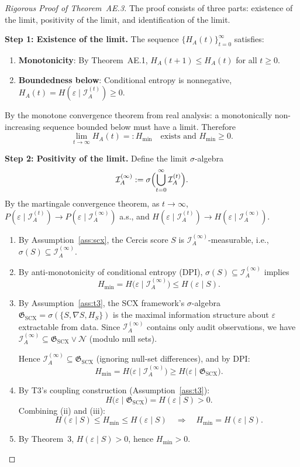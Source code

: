 \documentclass[12pt,a4paper]{article}
\newcommand{\cI}{\mathcal{I}}
\newcommand{\sG}{\mathfrak{G}}
\begin{document}
\begin{proof}[Rigorous Proof of Theorem~AE.3]
The proof consists of three parts: existence of the limit, positivity of the limit, and identification of the limit.

\textbf{Step 1: Existence of the limit.}
The sequence $\{H_A(t)\}_{t=0}^\infty$ satisfies:
\begin{enumerate}
    \item[(i)] \textbf{Monotonicity}: By Theorem~AE.1, $H_A(t+1) \le H_A(t)$ for all $t \ge 0$.
    \item[(ii)] \textbf{Boundedness below}: Conditional entropy is nonnegative, $H_A(t) = H(\varepsilon \mid \cI_A^{(t)}) \ge 0$.
\end{enumerate}
By the monotone convergence theorem from real analysis: a monotonically non-increasing sequence bounded below must have a limit. Therefore
\[
\lim_{t\to\infty} H_A(t) =: H_{\min} \quad \text{exists and } H_{\min} \ge 0.
\]

\textbf{Step 2: Positivity of the limit.}
Define the limit $\sigma$-algebra
\[
\cI_A^{(\infty)} := \sigma\Bigl(\bigcup_{t=0}^\infty \cI_A^{(t)}\Bigr).
\]
By the martingale convergence theorem, as $t \to \infty$, $P(\varepsilon \mid \cI_A^{(t)}) \to P(\varepsilon \mid \cI_A^{(\infty)})$ a.s., and $H(\varepsilon \mid \cI_A^{(t)}) \to H(\varepsilon \mid \cI_A^{(\infty)})$.

\begin{enumerate}
    \item[(i)] By Assumption~\ref{ass:scx}, the Cercis score $S$ is $\cI_A^{(\infty)}$-measurable, i.e., $\sigma(S) \subseteq \cI_A^{(\infty)}$.
    \item[(ii)] By anti-monotonicity of conditional entropy (DPI), $\sigma(S) \subseteq \cI_A^{(\infty)}$ implies
    \[
    H_{\min} = H\bigl(\varepsilon \mid \cI_A^{(\infty)}\bigr) \le H(\varepsilon \mid S).
    \]
    \item[(iii)] By Assumption~\ref{ass:t3}, the SCX framework's $\sigma$-algebra $\sG_{\mathrm{SCX}} = \sigma(\{S, \nabla S, H_S\})$ is the maximal information structure about $\varepsilon$ extractable from data. Since $\cI_A^{(\infty)}$ contains only audit observations, we have $\cI_A^{(\infty)} \subseteq \sG_{\mathrm{SCX}} \lor \mathcal{N}$ (modulo null sets).

    Hence $\cI_A^{(\infty)} \subseteq \sG_{\mathrm{SCX}}$ (ignoring null-set differences), and by DPI:
    \[
    H_{\min} = H\bigl(\varepsilon \mid \cI_A^{(\infty)}\bigr) \ge H\bigl(\varepsilon \mid \sG_{\mathrm{SCX}}\bigr).
    \]
    \item[(iv)] By T3's coupling construction (Assumption~\ref{ass:t3}):
    \[
    H\bigl(\varepsilon \mid \sG_{\mathrm{SCX}}\bigr) = H(\varepsilon \mid S) > 0.
    \]
    Combining (ii) and (iii):
    \[
    H(\varepsilon \mid S) \le H_{\min} \le H(\varepsilon \mid S) \quad\Longrightarrow\quad H_{\min} = H(\varepsilon \mid S).
    \]
    \item[(v)] By Theorem~3, $H(\varepsilon \mid S) > 0$, hence $H_{\min} > 0$.
\end{enumerate}


\end{proof}
\end{document}
